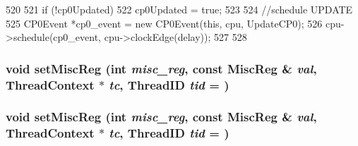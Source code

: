 \begin{DoxyCode}
520 {
521     if (!cp0Updated) {
522         cp0Updated = true;
523 
524         //schedule UPDATE
525         CP0Event *cp0_event = new CP0Event(this, cpu, UpdateCP0);
526         cpu->schedule(cp0_event, cpu->clockEdge(delay));
527     }
528 }
\end{DoxyCode}
\hypertarget{classMipsISA_1_1ISA_ab85b054f14d72781b7f540270867e2df}{
\subsubsection[{setMiscReg}]{\setlength{\rightskip}{0pt plus 5cm}void setMiscReg (int {\em misc\_\-reg}, \/  const {\bf MiscReg} \& {\em val}, \/  {\bf ThreadContext} $\ast$ {\em tc}, \/  {\bf ThreadID} {\em tid} = {})}}
\label{classMipsISA_1_1ISA_ab85b054f14d72781b7f540270867e2df}
\hypertarget{classMipsISA_1_1ISA_ab85b054f14d72781b7f540270867e2df}{
\subsubsection[{setMiscReg}]{\setlength{\rightskip}{0pt plus 5cm}void setMiscReg (int {\em misc\_\-reg}, \/  const {\bf MiscReg} \& {\em val}, \/  {\bf ThreadContext} $\ast$ {\em tc}, \/  {\bf ThreadID} {\em tid} = {})}}
\label{classMipsISA_1_1ISA_ab85b054f14d72781b7f540270867e2df}



